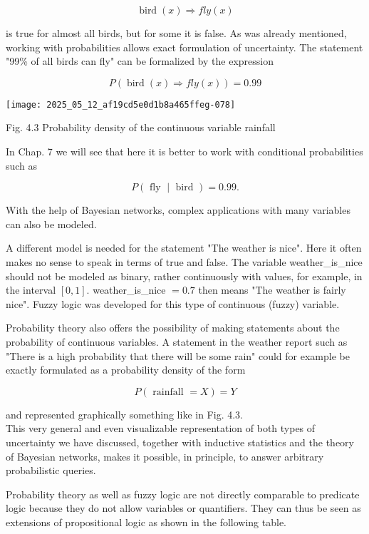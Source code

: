 \documentclass[10pt]{article}
\begin{document}
$$
\operatorname{bird}(x) \Rightarrow f l y(x)
$$

is true for almost all birds, but for some it is false. As was already mentioned, working with probabilities allows exact formulation of uncertainty. The statement "99\% of all birds can fly" can be formalized by the expression

$$
P(\operatorname{bird}(x) \Rightarrow f l y(x))=0.99
$$

\begin{center}
\texttt{[image: 2025\_05\_12\_af19cd5e0d1b8a465ffeg-078]}
\end{center}

Fig. 4.3 Probability density of the continuous variable rainfall

In Chap. 7 we will see that here it is better to work with conditional probabilities such as

$$
P(\text { fly } \mid \text { bird })=0.99 .
$$

With the help of Bayesian networks, complex applications with many variables can also be modeled.

A different model is needed for the statement "The weather is nice". Here it often makes no sense to speak in terms of true and false. The variable weather\_is\_nice should not be modeled as binary, rather continuously with values, for example, in the interval $[0,1]$. weather\_is\_nice $=0.7$ then means "The weather is fairly nice". Fuzzy logic was developed for this type of continuous (fuzzy) variable.

Probability theory also offers the possibility of making statements about the probability of continuous variables. A statement in the weather report such as "There is a high probability that there will be some rain" could for example be exactly formulated as a probability density of the form

$$
P(\text { rainfall }=X)=Y
$$

and represented graphically something like in Fig. 4.3.\\
This very general and even visualizable representation of both types of uncertainty we have discussed, together with inductive statistics and the theory of Bayesian networks, makes it possible, in principle, to answer arbitrary probabilistic queries.

Probability theory as well as fuzzy logic are not directly comparable to predicate logic because they do not allow variables or quantifiers. They can thus be seen as extensions of propositional logic as shown in the following table.
\end{document}
